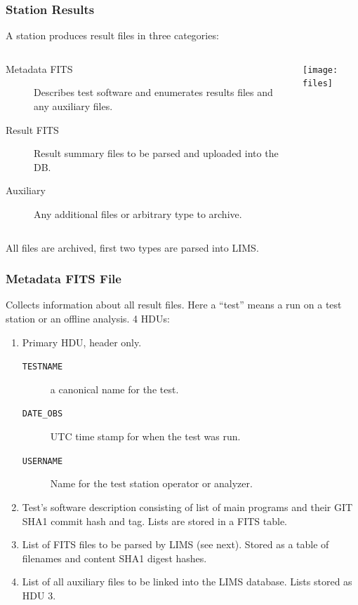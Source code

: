 \documentclass[bigger]{beamer}
\begin{document}
\begin{frame}
  \frametitle{Station Results}

  A station produces result files in three categories:

  \begin{columns}
    \begin{column}{0.5\paperwidth}
      \begin{description}
      \item[Metadata FITS] Describes test software and enumerates results
        files and any auxiliary files.
      \item[Result FITS] Result summary files to be parsed and uploaded
        into the DB.
      \item[Auxiliary] Any additional files or arbitrary type to archive.
      \end{description}
    \end{column}
    \begin{column}{0.45\paperwidth}
      \texttt{[image: files]}
    \end{column}
  \end{columns}
  All files are archived, first two types are parsed into LIMS.

\end{frame}

\begin{frame}
  \frametitle{Metadata FITS File} 

  Collects information about all result files.  Here a ``test'' means
  a run on a test station or an offline analysis.  4 HDUs:

  \begin{enumerate}
  \item Primary HDU, header only.
    \begin{description}
    \item[\texttt{TESTNAME}] a canonical name for the test.
    \item[\texttt{DATE\_OBS}] UTC time stamp for when the test was run.
    \item[\texttt{USERNAME}] Name for the test station operator or analyzer.
    \end{description}
  \item Test's software description consisting of list of main
    programs and their GIT SHA1 commit hash and tag.  Lists are stored
    in a FITS table.
  \item List of FITS files to be parsed by LIMS (see next).  Stored as
    a table of filenames and content SHA1 digest hashes.
  \item List of all auxiliary files to be linked into the LIMS
    database.  Lists stored as HDU 3.
  \end{enumerate}

\end{frame}
\end{document}
